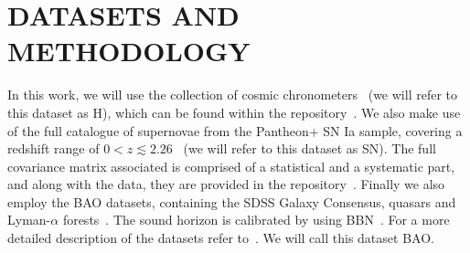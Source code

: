 \documentclass[twocolumn,a4paper,reprint,amssymb,aps,prd,groupedaddress,superscriptaddress,nofootinbib]{revtex4-2}
\begin{document}
\section{DATASETS AND METHODOLOGY}\label{section:data}


In this work, we will use the collection of cosmic chronometers~\cite{jimenez2003constraints,
simon2005constraints, stern2010cosmic, moresco2012new, zhang2014four, moresco2015raising, moresco20166}
(we will refer to this dataset as H), which can be found within the repository~\cite{hz}.
%
We also make use of the full catalogue of supernovae from the Pantheon+ SN Ia sample, covering a
redshift range of $0<z\lesssim2.26$~\cite{Scolnic:2021amr} (we will refer to this dataset as SN).
The full covariance matrix associated is comprised of a statistical and a systematic part, and along
with the data, they are provided in the repository~\cite{pantheon_data}.
%
Finally we also employ the BAO datasets, containing the SDSS Galaxy Consensus, quasars and Lyman-$\alpha$
forests~\cite{eBOSS:2020yzd}. The sound horizon is calibrated by using BBN~\cite{Cooke:2013cba}.
For a more detailed description of the datasets refer to~\cite{Escamilla:2021uoj}. We will call
this dataset BAO.\\
%


\begin{table}[t!]
%
\caption{Jeffreys' scale for model selection with the logarithm of the Bayes' factor.
Using the convention from~\cite{Trotta:2008qt}.}
\footnotesize
{}
\label{jeffreys}
\end{table}
\end{document}
